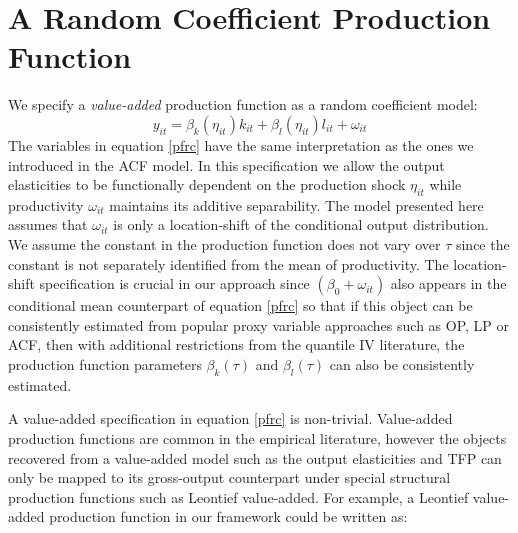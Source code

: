 \documentclass[11pt]{article}
\begin{document}
\section{A Random Coefficient Production Function} \label{ourmodel}
We specify a \textit{value-added} production function as a random coefficient model:
\begin{equation} \label{pfrc}
    y_{it}=\beta_{k}(\eta_{it})k_{it}+\beta_{l}(\eta_{it})l_{it}+\omega_{it}
\end{equation}
The variables in equation \eqref{pfrc} have the same interpretation as the ones we introduced in the ACF model. In this specification we allow the output elasticities to be functionally dependent on the production shock $\eta_{it}$ while productivity $\omega_{it}$ maintains its additive separability. The model presented here assumes that $\omega_{it}$ is only a location-shift of the conditional output distribution. We assume the constant in the production function does not vary over $\tau$ since the constant is not separately identified from the mean of productivity. The location-shift specification is crucial in our approach since $(\beta_{0}+\omega_{it})$ also appears in the conditional mean counterpart of equation \eqref{pfrc} so that if this object can be consistently estimated from popular proxy variable approaches such as OP, LP or ACF, then with additional restrictions from the quantile IV literature, the production function parameters $\beta_{k}(\tau)$ and $\beta_{l}(\tau)$ can also be consistently estimated.

 A value-added specification in equation \eqref{pfrc} is non-trivial. Value-added production functions are common in the empirical literature, however the objects recovered from a value-added model such as the output elasticities and TFP can only be mapped to its gross-output counterpart under special structural production functions such as Leontief value-added. For example, a Leontief value-added production function in our framework could be written as:
\end{document}
